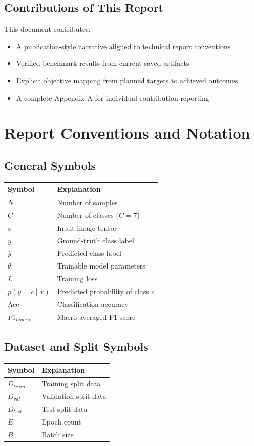 \documentclass[12pt,a4paper]{article}
\begin{document}
\subsection{Contributions of This Report}
This document contributes:
\begin{itemize}[leftmargin=*]
    \item A publication-style narrative aligned to technical report conventions
    \item Verified benchmark results from current saved artifacts
    \item Explicit objective mapping from planned targets to achieved outcomes
    \item A complete Appendix A for individual contribution reporting
\end{itemize}

\section{Report Conventions and Notation}

\subsection{General Symbols}
\begin{table}[h!]
\centering
\begin{tabularx}{\textwidth}{@{}l X@{}}
\toprule
Symbol & Explanation \\
\midrule
$N$ & Number of samples \\
$C$ & Number of classes ($C = 7$) \\
$x$ & Input image tensor \\
$y$ & Ground-truth class label \\
$\hat{y}$ & Predicted class label \\
$\theta$ & Trainable model parameters \\
$L$ & Training loss \\
$p(y=c\mid x)$ & Predicted probability of class $c$ \\
Acc & Classification accuracy \\
$F1_{macro}$ & Macro-averaged F1 score \\
\bottomrule
\end{tabularx}
\end{table}

\subsection{Dataset and Split Symbols}
\begin{table}[h!]
\centering
\begin{tabularx}{\textwidth}{@{}l X@{}}
\toprule
Symbol & Explanation \\
\midrule
$D_{train}$ & Training split data \\
$D_{val}$ & Validation split data \\
$D_{test}$ & Test split data \\
$E$ & Epoch count \\
$B$ & Batch size \\
\bottomrule
\end{tabularx}
\end{table}
\end{document}
